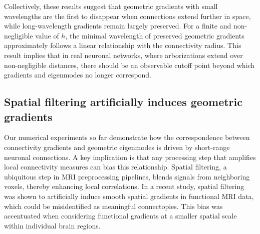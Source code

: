 \documentclass{article}
\begin{document}
Collectively, these results suggest that geometric gradients with small wavelengths are the first to disappear when connections extend further in space, while long-wavelength gradients remain largely preserved. For a finite and non-negligible value of $h$, the minimal wavelength of preserved geometric gradients approximately follows a linear relationship with the connectivity radius. This result implies that in real neuronal networks, where arborizations extend over non-negligible distances, there should be an observable cutoff point beyond which gradients and eigenmodes no longer correspond.

\subsection*{Spatial filtering artificially induces geometric gradients}

Our numerical experiments so far demonstrate how the correspondence between connectivity gradients and geometric eigenmodes is driven by short-range neuronal connections. A key implication is that any processing step that amplifies local connectivity measures can bias this relationship. Spatial filtering, a ubiquitous step in MRI preprocessing pipelines, blends signals from neighboring voxels, thereby enhancing local correlations. In a recent study\cite{watson2023connectopic}, spatial filtering was shown to artificially induce smooth spatial gradients in functional MRI data, which could be misidentified as meaningful connectopies\cite{haak2018connectopic}. This bias was accentuated when considering functional gradients at a smaller spatial scale within individual brain regions. 
\end{document}
